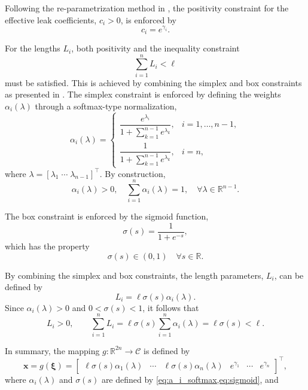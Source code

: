 Following the re-parametrization method in \cite{leplat2025}, the positivity constraint for the effective leak coefficients, $c_i > 0$, is enforced by
\begin{equation*}
c_i = e^{\gamma_i}.
\end{equation*}

For the lengths $L_i$, both positivity and the inequality constraint
\begin{equation*}
\sum_{i=1}^n L_i < \ell
\end{equation*}
must be satisfied. This is achieved by combining the simplex and box constraints as presented in \cite{leplat2025}. The simplex constraint is enforced by defining the weights $\alpha_i(\lambda)$ through a softmax-type normalization,
\begin{equation}
\label{eq:a_i_softmax}
\alpha_i(\lambda)
=\begin{cases}
\dfrac{e^{\lambda_i}}{1+\sum_{k=1}^{n-1} e^{\lambda_k}}, & i=1,\dots,n-1,\\[16pt]
\dfrac{1}{1+\sum_{k=1}^{n-1} e^{\lambda_k}}, & i=n,
\end{cases}
\end{equation}
where $\lambda=[\lambda_1\;\cdots\;\lambda_{n-1}]^\top$.
By construction,
\begin{equation*}
\alpha_i(\lambda) > 0,
\quad
\sum_{i=1}^n \alpha_i(\lambda) = 1,
\quad \forall  \lambda \in \mathbb{R}^{n-1}.
\end{equation*}

The box constraint is enforced by the sigmoid function,
\begin{equation}
\label{eq:sigmoid}
\sigma(s) = \frac{1}{1 + e^{-s}},
\end{equation}
which has the property
\begin{equation*}
\sigma(s) \in (0,1) \quad \forall s \in \mathbb{R}.
\end{equation*}

By combining the simplex and box constraints, the length parameters, $L_i$, can be defined by
\begin{equation*}
L_i = \ell \sigma(s) \alpha_i(\lambda).
\end{equation*}
Since $\alpha_i(\lambda) > 0$ and $0 < \sigma(s) < 1$, it follows that
\begin{equation*}
L_i > 0,
\qquad
\sum_{i=1}^n L_i
= \ell \sigma(s) \sum_{i=1}^n \alpha_i(\lambda)
= \ell \sigma(s) < \ell.
\end{equation*}

In summary, the mapping $g : \mathbb{R}^{2n} \to \mathcal{C}$ is defined by
\begin{equation}
\label{eq:g_func}
\mathbf{x}=g(\bm{\xi})
=
\begin{bmatrix}
\ell \sigma(s) \alpha_1(\lambda) & \cdots & \ell \sigma(s) \alpha_n(\lambda) &
e^{\gamma_1} & \cdots & e^{\gamma_n}
\end{bmatrix}^\top,
\end{equation}
where $\alpha_i(\lambda)$ and $\sigma(s)$ are defined by \cref{eq:a_i_softmax,eq:sigmoid}, and

